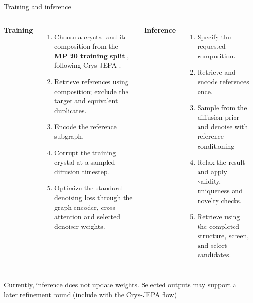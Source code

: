 \documentclass[10pt,aspectratio=169]{beamer}
\begin{document}
\begin{frame}{Training and inference}
\begin{columns}[T]
\textbf{Training}
\begin{enumerate}\setlength\itemsep{1.5mm}
\item Choose a crystal and its composition from the \textbf{MP-20 training split} \cite{xie2022cdvae}, following Crys-JEPA \cite{liu2026crysjepa}.
\item Retrieve references using composition; exclude the target and equivalent duplicates.
\item Encode the reference subgraph.
\item Corrupt the training crystal at a sampled diffusion timestep.
\item Optimize the standard denoising loss through the graph encoder, cross-attention and selected denoiser weights.
\end{enumerate}
\textbf{Inference}
\begin{enumerate}\setlength\itemsep{1.5mm}
\item Specify the requested composition.
\item Retrieve and encode references once.
\item Sample from the diffusion prior and denoise with reference conditioning.
\item Relax the result and apply validity, uniqueness and novelty checks.
\item Retrieve using the completed structure, screen, and select candidates.
\end{enumerate}
\end{columns}
\vspace{3mm}\small Currently, inference does not update weights. Selected outputs may support a later refinement round (include with the Crys-JEPA flow)
\end{frame}
\end{document}
